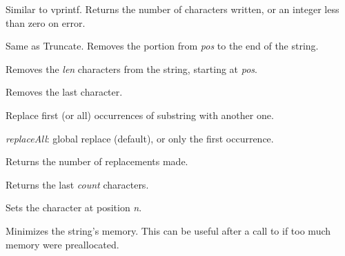 
Similar to vprintf. Returns the number of characters written, or an integer less than zero
on error.

\label{wxstringremove}


Same as Truncate. Removes the portion from {\it pos} to the end of the string.


Removes the {\it len} characters from the string, starting at {\it pos}.

\label{wxstringremovelast}


Removes the last character.

\label{wxstringreplace}


Replace first (or all) occurrences of substring with another one.

{\it replaceAll}: global replace (default), or only the first occurrence.

Returns the number of replacements made.

\label{wxstringright}


Returns the last {\it count} characters.

\label{wxstringsetchar}


Sets the character at position {\it n}.

\label{wxstringshrink}


Minimizes the string's memory. This can be useful after a call to 
 if too much memory were preallocated.

\label{wxstringsprintf}


